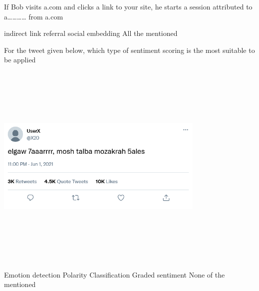 \documentclass[theme=sleek, randomorder, hidesidemenu]{webquiz}
\begin{document}
\begin{question}
  If Bob visits a.com and clicks a link to your site, he starts a session attributed
to a………… from a.com
\begin{choice}[columns=2]
  \incorrect indirect link
  \correct referral
  \incorrect social embedding
  \incorrect All the mentioned
\end{choice}
\end{question}

\begin{question}
  For the tweet given below, which type of sentiment scoring is the most suitable
to be applied
  \begin{center}
    \includegraphics[height=100mm, width=100mm]{tweet.png}
  \end{center}
  \begin{choice}[columns=2]
    \correct Emotion detection
    \incorrect Polarity Classification
    \incorrect Graded sentiment
    \incorrect None of the mentioned
  \end{choice}
\end{question}
\end{document}
